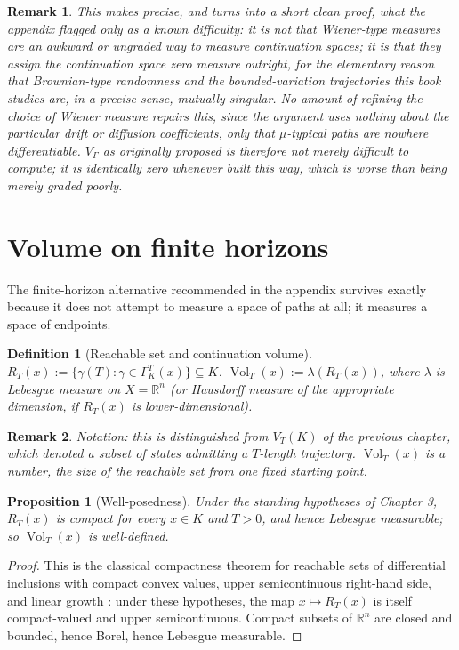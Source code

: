 \documentclass[11pt]{report}
\newtheorem{proposition}{Proposition}[chapter]
\newtheorem{definition}{Definition}[chapter]
\newtheorem{remark}{Remark}[chapter]
\begin{document}
\begin{remark}
This makes precise, and turns into a short clean proof, what the
appendix flagged only as a known difficulty: it is not that Wiener-type
measures are an awkward or ungraded way to measure continuation spaces;
it is that they assign the continuation space zero measure outright,
for the elementary reason that Brownian-type randomness and the
bounded-variation trajectories this book studies are, in a precise
sense, mutually singular. No amount of refining the choice of Wiener
measure repairs this, since the argument uses nothing about the
particular drift or diffusion coefficients, only that $\mu$-typical
paths are nowhere differentiable. $V_\Gamma$ as originally proposed is
therefore not merely difficult to compute; it is identically zero
whenever built this way, which is worse than being merely graded
poorly.
\end{remark}

\section*{Volume on finite horizons}

The finite-horizon alternative recommended in the appendix survives
exactly because it does not attempt to measure a space of paths at all;
it measures a space of endpoints.

\begin{definition}[Reachable set and continuation volume]
$R_T(x) := \{\gamma(T) : \gamma \in \Gamma_K^T(x)\} \subseteq K$.
$\operatorname{Vol}_T(x) := \lambda(R_T(x))$, where $\lambda$ is
Lebesgue measure on $X = \mathbb{R}^n$ (or Hausdorff measure of the
appropriate dimension, if $R_T(x)$ is lower-dimensional).
\end{definition}

\begin{remark}
Notation: this is distinguished from $V_T(K)$ of the previous chapter,
which denoted a \emph{subset of states} admitting a $T$-length
trajectory. $\operatorname{Vol}_T(x)$ is a number, the size of the
reachable set from one fixed starting point.
\end{remark}

\begin{proposition}[Well-posedness]
Under the standing hypotheses of Chapter 3, $R_T(x)$ is compact for
every $x \in K$ and $T > 0$, and hence Lebesgue measurable; so
$\operatorname{Vol}_T(x)$ is well-defined.
\end{proposition}
\begin{proof}
This is the classical compactness theorem for reachable sets of
differential inclusions with compact convex values, upper
semicontinuous right-hand side, and linear growth
\cite{aubincellina1984,filippov1988}: under these hypotheses, the map
$x \mapsto R_T(x)$ is itself compact-valued and upper semicontinuous.
Compact subsets of $\mathbb{R}^n$ are closed and bounded, hence Borel,
hence Lebesgue measurable.
\end{proof}
\end{document}
